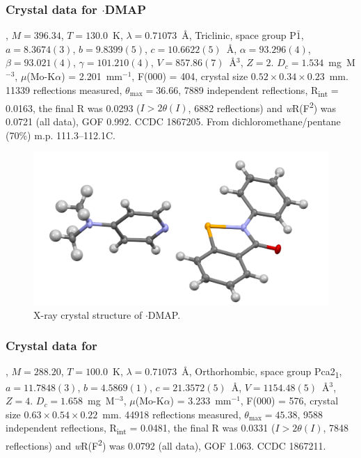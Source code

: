 \begin{refsection}
    \subsubsection{Crystal data for \texorpdfstring{$ \cdot $DMAP}{C20H19N3OSe}}
    , $M=396.34$, $T=130.0$~K, $ \lambda=0.71073 $~\AA, Triclinic, space group P$\bar{1}$, $a = 8.3674(3)$, $b = 9.8399(5)$, $c =10.6622(5)$~\AA, $\alpha=93.296(4)$\degree, $\beta=93.021(4)$\degree, $\gamma=101.210(4)$\degree, $V=857.86(7)$~\AA$^{3}$, $Z = 2$.
    $D_{c}= 1.534$~mg~M$^{-3}$, $\mu$(Mo-K$\alpha$) = 2.201~mm$^{-1}$, F(000) = 404, crystal size $0.52 \times 0.34 \times 0.23$~mm.
    11339 reflections measured, $\theta_{\max}=36.66$\degree, 7889 independent reflections, R\textsubscript{int} = 0.0163, the final R was 0.0293 ($I > 2\theta(I)$, 6882 reflections) and \textit{w}R(F\textsuperscript{2}) was 0.0721 (all data), GOF 0.992.
    CCDC 1867205.
    From dichloromethane/pentane (70\%) m.p. 111.3--112.1\degree{}C.
    
    \begin{figure}
      \includegraphics[width=0.6\linewidth]{Figures/ebs-dmap-xtal.pdf}
      \caption{X-ray crystal structure of \texorpdfstring{$ \cdot $DMAP}{C20H19N3OSe}.}
    \end{figure}
    
    \subsubsection{Crystal data for \texorpdfstring{}{C14H11NOSe}}
    , $M=288.20$, $T=100.0$~K, $ \lambda=0.71073 $~\AA, Orthorhombic, space group Pca2\textsubscript{1}, $a = 11.7848(3)$, $b = 4.5869(1)$, $c = 21.3572(5)$~\AA, $V = 1154.48(5)$~\AA$^{3}$, $Z = 4$.
    $D_{c}= 1.658$~mg~M$^{-3}$, $\mu$(Mo-K$\alpha$) = 3.233~mm$^{-1}$, F(000) = 576, crystal size $0.63 \times 0.54 \times 0.22$~mm.
    44918 reflections measured, $\theta_{\max}=45.38$\degree, 9588 independent reflections, R\textsubscript{int} = 0.0481, the final R was 0.0331 ($I > 2\theta(I)$, 7848 reflections) and \textit{w}R(F\textsuperscript{2}) was 0.0792 (all data), GOF 1.063.
    CCDC 1867211.
    

\end{refsection}
